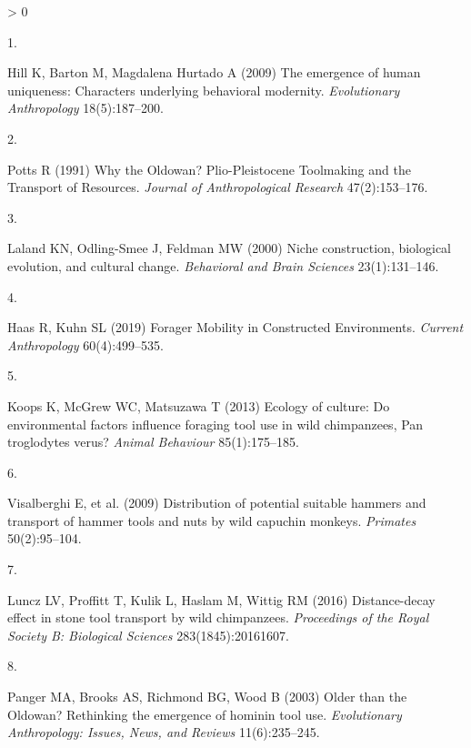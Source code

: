 \documentclass[9pt,twocolumn,twoside,]{pnas-new}
\newlength{\csllabelwidth}
\newlength{\cslhangindent}
\newenvironment{CSLReferences}[3] %
 {%
  \setlength{\parindent}{0pt}
  \ifodd #1 \everypar{\setlength{\hangindent}{\cslhangindent}}\ignorespaces\fi
  \ifnum #2 > 0
  \setlength{\parskip}{#2\baselineskip}
  \fi
 }%
 {}
\newcommand{\CSLLeftMargin}[1]{\parbox[t]{\csllabelwidth}{#1}}
\newcommand{\CSLRightInline}[1]{\parbox[t]{\linewidth - \csllabelwidth}{#1}}
\begin{document}
\hypertarget{refs}{}
\begin{CSLReferences}{0}{0}
\leavevmode\hypertarget{ref-hillEmergenceHumanUniqueness2009}{}%
\CSLLeftMargin{1. }
\CSLRightInline{Hill K, Barton M, Magdalena Hurtado A (2009) The
emergence of human uniqueness: {Characters} underlying behavioral
modernity. \emph{Evolutionary Anthropology} 18(5):187--200.}

\leavevmode\hypertarget{ref-pottsWhyOldowanPlioPleistocene1991}{}%
\CSLLeftMargin{2. }
\CSLRightInline{Potts R (1991) Why the {Oldowan}? {Plio}-{Pleistocene
Toolmaking} and the {Transport} of {Resources}. \emph{Journal of
Anthropological Research} 47(2):153--176.}

\leavevmode\hypertarget{ref-lalandNicheConstructionBiological2000}{}%
\CSLLeftMargin{3. }
\CSLRightInline{Laland KN, Odling-Smee J, Feldman MW (2000) Niche
construction, biological evolution, and cultural change.
\emph{Behavioral and Brain Sciences} 23(1):131--146.}

\leavevmode\hypertarget{ref-haasForagerMobilityConstructed2019}{}%
\CSLLeftMargin{4. }
\CSLRightInline{Haas R, Kuhn SL (2019) Forager {Mobility} in
{Constructed Environments}. \emph{Current Anthropology} 60(4):499--535.}

\leavevmode\hypertarget{ref-koopsEcologyCultureEnvironmental2013}{}%
\CSLLeftMargin{5. }
\CSLRightInline{Koops K, McGrew WC, Matsuzawa T (2013) Ecology of
culture: Do environmental factors influence foraging tool use in wild
chimpanzees, {Pan} troglodytes verus? \emph{Animal Behaviour}
85(1):175--185.}

\leavevmode\hypertarget{ref-visalberghiDistributionPotentialSuitable2009}{}%
\CSLLeftMargin{6. }
\CSLRightInline{Visalberghi E, et al. (2009) Distribution of potential
suitable hammers and transport of hammer tools and nuts by wild capuchin
monkeys. \emph{Primates} 50(2):95--104.}

\leavevmode\hypertarget{ref-lunczDistancedecayEffectStone2016}{}%
\CSLLeftMargin{7. }
\CSLRightInline{Luncz LV, Proffitt T, Kulik L, Haslam M, Wittig RM
(2016) Distance-decay effect in stone tool transport by wild
chimpanzees. \emph{Proceedings of the Royal Society B: Biological
Sciences} 283(1845):20161607.}

\leavevmode\hypertarget{ref-pangerOlderOldowanRethinking2003}{}%
\CSLLeftMargin{8. }
\CSLRightInline{Panger MA, Brooks AS, Richmond BG, Wood B (2003) Older
than the {Oldowan}? {Rethinking} the emergence of hominin tool use.
\emph{Evolutionary Anthropology: Issues, News, and Reviews}
11(6):235--245.}


\end{CSLReferences}
\end{document}
